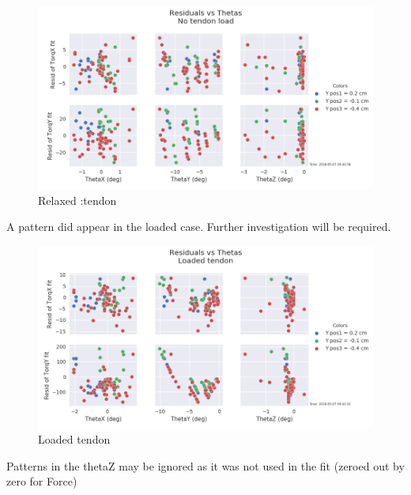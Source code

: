 \documentclass[12pt]{article}
\begin{document}
\begin{figure}[H]
\centering
\includegraphics[width=.9\textwidth]{images/stiff/GOODResid_vs_Theta.png}
\caption{Relaxed :tendon}
\end{figure}

A pattern did appear in the loaded case. Further investigation will be required.

\begin{figure}[H]
\centering
\includegraphics[width=.9\textwidth]{images/stiff/GOODResid_vs_Theta_loaded.png}
\caption{Loaded tendon}
\end{figure}

Patterns in the thetaZ may be ignored as it was not used in the fit (zeroed out by zero for Force)
\end{document}
